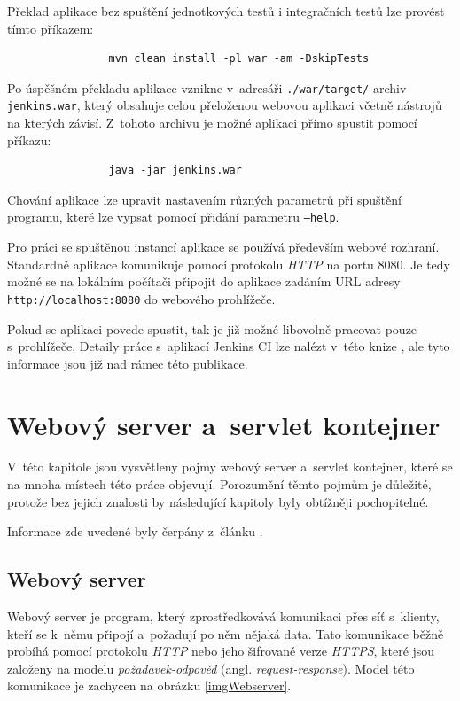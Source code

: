             Překlad aplikace bez spuštění jednotkových testů i integračních testů lze provést tímto příkazem:
            \begin{verbatim}
                mvn clean install -pl war -am -DskipTests
            \end{verbatim}
            
            \medskip
            Po úspěšném překladu aplikace vznikne v~adresáři \texttt{./war/target/} archiv \texttt{jenkins.war}, 
            který obsahuje celou přeloženou webovou aplikaci včetně nástrojů na 
            kterých závisí. Z~tohoto archivu je možné aplikaci přímo spustit pomocí příkazu:

            \begin{verbatim}
                java -jar jenkins.war
            \end{verbatim}
            Chování aplikace lze upravit nastavením různých parametrů při spuštění programu, 
            které lze vypsat pomocí přidání parametru \texttt{--help}.

            Pro práci se spuštěnou instancí aplikace se používá především webové rozhraní. Standardně aplikace
            komunikuje pomocí protokolu \emph{HTTP} na portu 8080. Je tedy možné se na lokálním počítači připojit do aplikace zadáním URL adresy 
            \texttt{http://localhost:8080} do webového prohlížeče. 

            Pokud se aplikaci povede spustit, tak je již možné libovolně pracovat pouze s~prohlížeče. Detaily práce s~aplikací Jenkins CI
            lze nalézt v~této knize \cite{jenkinsBook}, ale tyto informace jsou již nad rámec této publikace.


            
       
    \section{Webový server a~servlet kontejner} \label{servletWebserver}
        V~této kapitole jsou vysvětleny pojmy webový server a~servlet kontejner, které se 
        na mnoha místech této práce objevují. Porozumění těmto pojmům je důležité, protože bez
        jejich znalosti by následující kapitoly byly obtížněji pochopitelné.
        
        Informace zde uvedené byly čerpány z~článku \cite{webserverVsServletPage}.

        \subsection{Webový server}
            Webový server je program, který zprostředkovává komunikaci přes síť s~klienty, kteří
            se k~němu připojí a~požadují po něm nějaká data. Tato komunikace běžně probíhá pomocí protokolu \emph{HTTP}
            nebo jeho šifrované verze \emph{HTTPS},
            které jsou založeny na modelu \emph{požadavek-odpověd} (angl. \emph{request-response}).
            Model této komunikace je zachycen na obrázku \ref{imgWebserver}.
            
